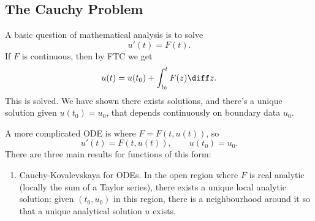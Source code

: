 \documentclass[12pt]{article}
\begin{document}
\begin{center}
\end{center}

\subsection{The Cauchy Problem}%
\label{sub:cauchy}

A basic question of mathematical analysis is to solve
\[
u'(t) = F(t).
\]
If $F$ is continuous, then by FTC we get
\[
u(t) = u(t_0) + \int_{t_0}^t F(z) \diff z.
\]
This is solved. We have shown there exists solutions, and there's a unique solution given $u(t_0) = u_0$, that depends continuously on boundary data $u_0$.

A more complicated ODE is where $F = F(t, u(t))$, so
\[
u'(t) = F(t, u(t)), \qquad u(t_0) = u_0.
\]
There are three main results for functions of this form:
\begin{enumerate}[Result 1.]
	\item Cauchy-Kovalevskaya for ODEs. In the open region where $F$ is real analytic (locally the sum of a Taylor series), there exists a unique local analytic solution: given $(t_0, u_0)$ in this region, there is a neighbourhood around it so that a unique analytical solution $u$ exists.
\end{enumerate}
\end{document}
